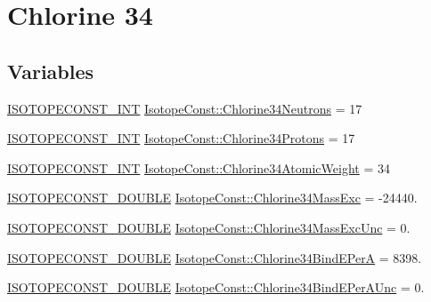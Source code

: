 \hypertarget{group___isotope_const-_chlorine-_cl34}{}\section{Chlorine 34}
\label{group___isotope_const-_chlorine-_cl34}
\subsection*{Variables}
\begin{DoxyCompactItemize}
\item 
\mbox{\hyperlink{group___isotope_const-_macros_ga5f18360b3e99483a35c32d789e62621c}{I\+S\+O\+T\+O\+P\+E\+C\+O\+N\+S\+T\+\_\+\+I\+NT}} \mbox{\hyperlink{group___isotope_const-_chlorine-_cl34_ga1c13d043e616904e8e4c4ec695f2358b}{Isotope\+Const\+::\+Chlorine34\+Neutrons}} = 17
\item 
\mbox{\hyperlink{group___isotope_const-_macros_ga5f18360b3e99483a35c32d789e62621c}{I\+S\+O\+T\+O\+P\+E\+C\+O\+N\+S\+T\+\_\+\+I\+NT}} \mbox{\hyperlink{group___isotope_const-_chlorine-_cl34_ga47e99456c0e42e0f3241373bab87582e}{Isotope\+Const\+::\+Chlorine34\+Protons}} = 17
\item 
\mbox{\hyperlink{group___isotope_const-_macros_ga5f18360b3e99483a35c32d789e62621c}{I\+S\+O\+T\+O\+P\+E\+C\+O\+N\+S\+T\+\_\+\+I\+NT}} \mbox{\hyperlink{group___isotope_const-_chlorine-_cl34_ga7d485b1a2435a9576441f154d22664c0}{Isotope\+Const\+::\+Chlorine34\+Atomic\+Weight}} = 34
\item 
\mbox{\hyperlink{group___isotope_const-_macros_ga8f45a7272ce02c0b4c65c44636ed719a}{I\+S\+O\+T\+O\+P\+E\+C\+O\+N\+S\+T\+\_\+\+D\+O\+U\+B\+LE}} \mbox{\hyperlink{group___isotope_const-_chlorine-_cl34_gac5acefb462a86f8e1b77e4895d041127}{Isotope\+Const\+::\+Chlorine34\+Mass\+Exc}} = -\/24440.
\item 
\mbox{\hyperlink{group___isotope_const-_macros_ga8f45a7272ce02c0b4c65c44636ed719a}{I\+S\+O\+T\+O\+P\+E\+C\+O\+N\+S\+T\+\_\+\+D\+O\+U\+B\+LE}} \mbox{\hyperlink{group___isotope_const-_chlorine-_cl34_ga370d3b26a4955e7f2a227b21a498bc29}{Isotope\+Const\+::\+Chlorine34\+Mass\+Exc\+Unc}} = 0.
\item 
\mbox{\hyperlink{group___isotope_const-_macros_ga8f45a7272ce02c0b4c65c44636ed719a}{I\+S\+O\+T\+O\+P\+E\+C\+O\+N\+S\+T\+\_\+\+D\+O\+U\+B\+LE}} \mbox{\hyperlink{group___isotope_const-_chlorine-_cl34_ga3bbbf578fa17075b00efce10a1c5858c}{Isotope\+Const\+::\+Chlorine34\+Bind\+E\+PerA}} = 8398.
\item 
\mbox{\hyperlink{group___isotope_const-_macros_ga8f45a7272ce02c0b4c65c44636ed719a}{I\+S\+O\+T\+O\+P\+E\+C\+O\+N\+S\+T\+\_\+\+D\+O\+U\+B\+LE}} \mbox{\hyperlink{group___isotope_const-_chlorine-_cl34_gaab4f58d6119378c8ac0606edd9995101}{Isotope\+Const\+::\+Chlorine34\+Bind\+E\+Per\+A\+Unc}} = 0.

\end{DoxyCompactItemize}
